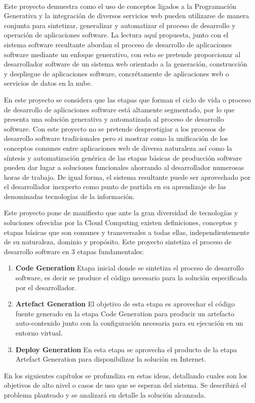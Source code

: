 
\vspace{0.7cm}
\\


Este proyecto demuestra como el uso de conceptos ligados a la  Programación Generativa y la integración de diversos servicios web pueden utilizarse de manera conjunta para sintetizar, generalizar y automatizar el proceso de desarrollo y operación de aplicaciones software. La lectura aquí propuesta, junto con el sistema software resultante abordan  el proceso de desarrollo de aplicaciones software mediante un enfoque generativo, con esto  se pretende proporcionar al desarrollador software de un sistema web orientado a la generación, construcción y despliegue de aplicaciones software, concrétamente de aplicaciones  web o servicios de datos en la nube.
 
 En este proyecto se considera que las etapas que forman el ciclo de vida o proceso de desarrollo de aplicaciones software está altamente segmentado, por lo que presenta una solución generativa y automatizada al proceso de desarrollo software. Con este proyecto no se pretende desprestigiar a los procesos de desarrollo software tradicionales pero si mostrar como la unificación de los conceptos comunes entre aplicaciones web de diversa naturaleza así como la síntesis y  automatización genérica de las etapas básicas de producción software pueden dar lugar a soluciones funcionales ahorrando al desarrollador numerosas horas de trabajo. De igual forma, el sistema resultante  puede ser aprovechado por el desarrollador inexperto como punto de partida en su aprendizaje de las denominadas tecnologías de la información.
 
 
Este proyecto pone de manifiesto que ante la gran diversidad de tecnologías y soluciones ofrecidas por la Cloud Computing  existen definiciones, conceptos y  etapas básicas que son  comunes  y transversales  a todas ellas, independientemente de su naturaleza, dominio y propósito. Este proyecto sintetiza el proceso de desarrollo software en 3 etapas fundamentales: 

\begin{enumerate}
\item \textbf{ Code Generation }  Etapa inicial donde se sintetiza el proceso de desarrollo software, es decir se produce el código necesario para la solución especificada por el desarrollador. 
\item \textbf{ Artefact Generation }  El objetivo de esta etapa es aprovechar el código fuente generado en la etapa Code Generation para producir un artefacto auto-contenido junto con la configuración necesaria para su ejecución en un entorno virtual. 
\item \textbf{ Deploy Generation } En esta etapa se aprovecha el producto de la etapa Artefact Generation para disponibilizar la solución en Internet. 
\end{enumerate}
 

En los siguientes capítulos se profundiza en estas ideas, detallando cuales son los objetivos de alto nivel o casos de uso que se esperan del sistema. Se describirá el problema planteado y se analizará en detalle la solución alcanzada.


